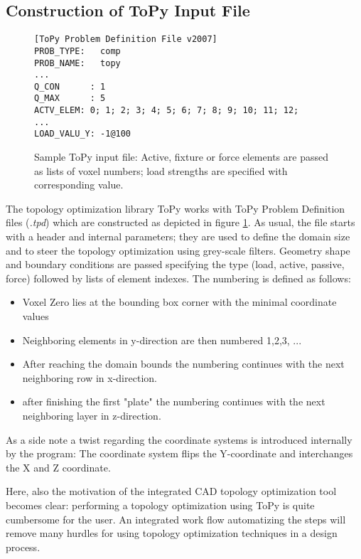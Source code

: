 \subsection{Construction of ToPy Input File}
\label{sec: ToPyInputConstruction}

\begin{figure}
\begin{lstlisting}
[ToPy Problem Definition File v2007]
PROB_TYPE:   comp
PROB_NAME:   topy
...
Q_CON      : 1
Q_MAX      : 5
ACTV_ELEM: 0; 1; 2; 3; 4; 5; 6; 7; 8; 9; 10; 11; 12; 
...
LOAD_VALU_Y: -1@100
\end{lstlisting}
\caption{Sample ToPy input file: Active, fixture or force elements are passed as lists of voxel numbers; load strengths are specified with corresponding value.}
\label{fig:TPDfile}
\end{figure}
The topology optimization library ToPy works with ToPy Problem Definition files ({\it.tpd}) which are constructed as depicted in figure \ref{fig:TPDfile}. As usual, the file starts with a header and internal parameters; they are used to define the domain size and to steer the topology optimization using grey-scale filters. Geometry shape and boundary conditions are passed specifying the type (load, active, passive, force) followed by lists of element indexes. The numbering is defined as follows:
\begin{itemize}
\item Voxel Zero lies at the bounding box corner with the minimal coordinate values
\item Neighboring elements in y-direction are then numbered 1,2,3, ...
\item After reaching the domain bounds the numbering continues with the next neighboring row in x-direction.
\item after finishing the first "plate" the numbering continues with the next neighboring layer in z-direction.
\end{itemize}
As a side note a twist regarding the coordinate systems is introduced internally by the program: The coordinate system flips the Y-coordinate and interchanges the X and Z coordinate. 

Here, also the motivation of the integrated CAD topology optimization tool becomes clear: performing a topology optimization using ToPy is quite cumbersome for the user. An integrated work flow automatizing the steps will remove many hurdles for using topology optimization techniques in a design process.  

